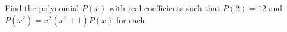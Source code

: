 Find the polynomial $P(x)$ with real coefficients such that $P(2)=12$ and $P(x^2)=x^2(x^2+1)P(x)$ for each 